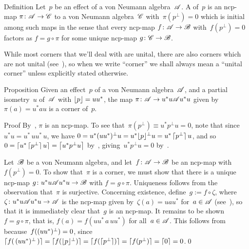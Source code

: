 \documentclass[a]{subfiles}
\begin{document}
\begin{parsec}%
\begin{point}[corner]{Definition}%
Let~$p$ be an effect of a von Neumann algebra~$\mathscr{A}$.
A  of~$p$ is an
ncp-map $\pi\colon \mathscr{A}\to\mathscr{C}$
to a von Neumann algebra~$\mathscr{C}$
with~$\pi(p^\perp)=0$
which is initial among such maps 
in the sense
that every ncp-map $f\colon \mathscr{A}\to\mathscr{B}$
with~$f(p^\perp)=0$
factors as $f=g\circ\pi$
for some unique ncp-map $g\colon \mathscr{C}\to\mathscr{B}$.

While most corners
that we'll deal with are unital,
there are also corners which are not unital
(see~),
so when we write ``corner'' we shall
always mean a ``unital corner''
unless explicitly stated otherwise.
\end{point}
\begin{point}{Proposition}%
Given an effect~$p$ of a von Neumann algebra~$\mathscr{A}$,
and a partial isometry~$u$ of~$\mathscr{A}$
with $\left\lfloor p\right\rfloor=uu^*$,
the map $\pi\colon \mathscr{A}\to u^*u \mathscr{A} u^*u$
given by~$\pi(a)=u^*au$ is a corner of~$p$.
\begin{point}{Proof}%
By~, $\pi$ is an ncp-map.
To see that~$\pi(p^\perp)\equiv u^*p^\perp u =0$,
note that since~$u^*u=u^*\,u u^*\,u$,
we have $0=u^*(uu^*)^\perp u =u^*\smash{\left\lfloor p\right\rfloor}^\perp u
= u^*\left\lceil\smash{p^\perp}\right\rceil u$,
and so
$0 = \left\lceil u^* \left\lceil\smash{p^\perp}\right\rceil u \right\rceil
=\left\lceil u^* p^\perp u\right\rceil$
by~,
giving~$u^*p^\perp u=0$
by~.


Let~$\mathscr{B}$ be a von Neumann algebra,
and let~$f\colon \mathscr{A}\to\mathscr{B}$ be an ncp-map
with $f(p^\perp)=0$.
To show that~$\pi$ is a corner,
we must show that there is a unique ncp-map
$g\colon u^*u \mathscr{A} u^*u\to\mathscr{B}$
with $f=g\circ \pi$.
Uniqueness follows
from the observation that~$\pi$ is surjective.
Concerning existence,
define~$g:= f\circ \zeta$,
where $\zeta\colon  u^*u\mathscr{A} u^*u\to \mathscr{A}$
is the ncp-map given by~$\zeta(a)=uau^*$
for~$a\in\mathscr{A}$ (see~),
so that it is immediately clear that~$g$ is an ncp-map.
It remains to be shown~$f=g\circ \pi$,
that is,
$f(a)=f(uu^*\,a\,uu^*)$ for all~$a\in\mathscr{A}$.
This follows from~
because~$f(\smash{(uu^*)^\perp})=0$,
since~$\left\lceil\smash{f(\,\smash{(uu^*)^\perp}\,)}\right\rceil
=\left\lceil\smash{f(\smash{\left\lfloor p\right\rfloor}^\perp)}\right\rceil
=\left\lceil\smash{f(\left\lceil\smash{p^\perp}\right\rceil)}\right\rceil
= \left\lceil\smash{f(p^\perp)}\right\rceil=\left\lceil0\right\rceil=0$.\qed
\end{point}
\end{point}
\end{parsec}
\end{document}
